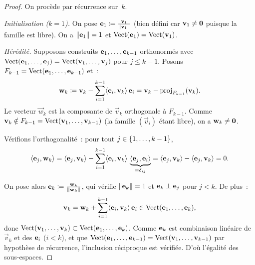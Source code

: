 \begin{proof}
  On procède par récurrence sur~$k$.

  \emph{Initialisation ($k=1$).} On pose
  $\mathbf{e}_{1}\coloneqq\frac{\mathbf{v}_1}{\lVert\mathbf{v}_1\rVert}$
  (bien défini car $\mathbf{v}_1\neq\mathbf{0}$ puisque la famille est libre).
  On a $\lVert\mathbf{e}_{1}\rVert=1$ et
  $\operatorname{Vect}(\mathbf{e}_{1})=\operatorname{Vect}(\mathbf{v}_1)$.

  \emph{Hérédité.} Supposons construits
  $\mathbf{e}_{1},\ldots,\mathbf{e}_{k-1}$ orthonormés avec
  $\operatorname{Vect}(\mathbf{e}_{1},\ldots,\mathbf{e}_{j})
  =\operatorname{Vect}(\mathbf{v}_1,\ldots,\mathbf{v}_j)$ pour $j\leq k-1$.
  Posons $F_{k-1}=\operatorname{Vect}(\mathbf{e}_{1},\ldots,\mathbf{e}_{k-1})$ et~:
  \[
    \mathbf{w}_k\coloneqq\mathbf{v}_k
    -\sum_{i=1}^{k-1}\langle\mathbf{e}_{i},\mathbf{v}_k\rangle\,\mathbf{e}_{i}
    =\mathbf{v}_k-\operatorname{proj}_{F_{k-1}}(\mathbf{v}_k).
  \]
  Le vecteur $\vec{w}_k$ est la composante de $\vec{v}_k$ orthogonale
  à $F_{k-1}$. Comme $\mathbf{v}_k\notin F_{k-1}=\operatorname{Vect}(\mathbf{v}_1,
  \ldots,\mathbf{v}_{k-1})$ (la famille $(\vec{v}_i)$ étant libre),
  on a $\mathbf{w}_k\neq\mathbf{0}$.

  Vérifions l'orthogonalité~: pour tout $j\in\left\{1,\ldots,k-1\right\}$,
  \[
    \langle\mathbf{e}_{j},\mathbf{w}_k\rangle
    =\langle\mathbf{e}_{j},\mathbf{v}_k\rangle
    -\sum_{i=1}^{k-1}\langle\mathbf{e}_{i},\mathbf{v}_k\rangle\,
    \underbrace{\langle\mathbf{e}_{j},\mathbf{e}_{i}\rangle}_{=\delta_{ij}}
    =\langle\mathbf{e}_{j},\mathbf{v}_k\rangle-\langle\mathbf{e}_{j},\mathbf{v}_k\rangle=0.
  \]

  On pose alors $\mathbf{e}_{k}\coloneqq\frac{\mathbf{w}_k}{\lVert\mathbf{w}_k\rVert}$,
  qui vérifie $\lVert\mathbf{e}_{k}\rVert=1$ et $\mathbf{e}_{k}\perp\mathbf{e}_{j}$ pour
  $j<k$. De plus~:
  \[
    \mathbf{v}_k=\mathbf{w}_k+\sum_{i=1}^{k-1}\langle\mathbf{e}_{i},\mathbf{v}_k\rangle
    \,\mathbf{e}_{i}
    \in\operatorname{Vect}(\mathbf{e}_{1},\ldots,\mathbf{e}_{k}),
  \]
  donc $\operatorname{Vect}(\mathbf{v}_1,\ldots,\mathbf{v}_k)
  \subset\operatorname{Vect}(\mathbf{e}_{1},\ldots,\mathbf{e}_{k})$. Comme $\mathbf{e}_{k}$ est
  combinaison linéaire de $\vec{v}_k$ et des $\mathbf{e}_{i}$ ($i<k$),
  et que $\operatorname{Vect}(\mathbf{e}_{1},\ldots,\mathbf{e}_{k-1})
  =\operatorname{Vect}(\mathbf{v}_1,\ldots,\mathbf{v}_{k-1})$ par hypothèse de
  récurrence, l'inclusion réciproque est vérifiée. D'où l'égalité des
  sous-espaces.
\end{proof}

